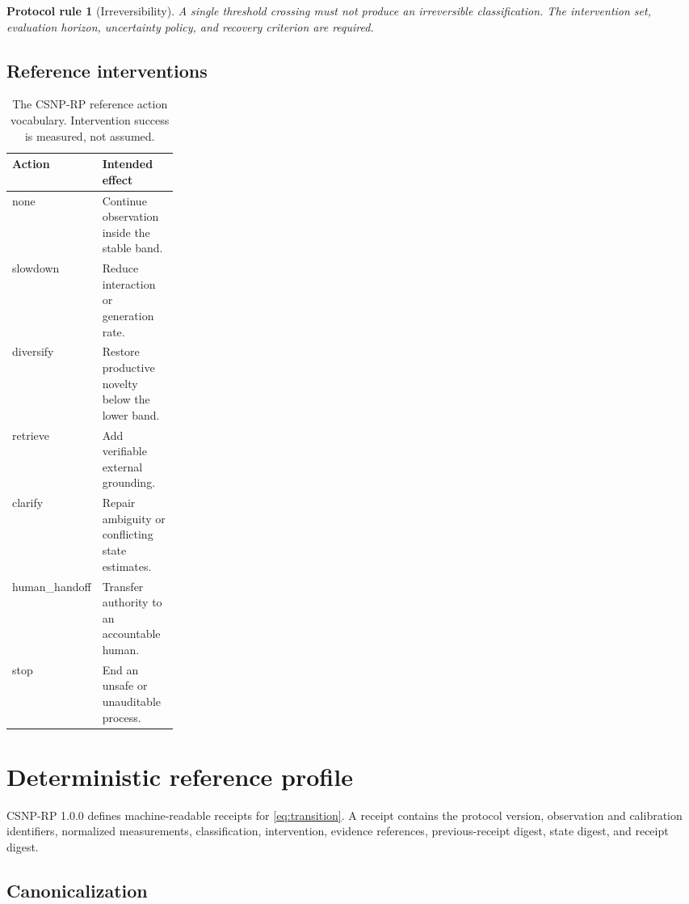 \documentclass[11pt]{article}
\newtheorem{protocolrule}{Protocol rule}
\begin{document}
\begin{protocolrule}[Irreversibility]
A single threshold crossing must not produce an irreversible classification.
The intervention set, evaluation horizon, uncertainty policy, and recovery
criterion are required.
\end{protocolrule}

\subsection{Reference interventions}

\begin{table}[ht]
\centering
\small
\begin{tabularx}{\linewidth}{>{\ttfamily}p{0.24\linewidth}X}
\toprule
\normalfont\textbf{Action} & \textbf{Intended effect}\\
\midrule
none          & Continue observation inside the stable band.\\
slowdown      & Reduce interaction or generation rate.\\
diversify     & Restore productive novelty below the lower band.\\
retrieve      & Add verifiable external grounding.\\
clarify       & Repair ambiguity or conflicting state estimates.\\
human\_handoff & Transfer authority to an accountable human.\\
stop          & End an unsafe or unauditable process.\\
\bottomrule
\end{tabularx}
\caption{The CSNP-RP reference action vocabulary. Intervention success is
measured, not assumed.}
\label{tab:actions}
\end{table}

\section{Deterministic reference profile}

CSNP-RP 1.0.0 defines machine-readable receipts for
\cref{eq:transition}. A receipt contains the protocol version, observation and
calibration identifiers, normalized measurements, classification,
intervention, evidence references, previous-receipt digest, state digest, and
receipt digest.

\subsection{Canonicalization}
\end{document}
